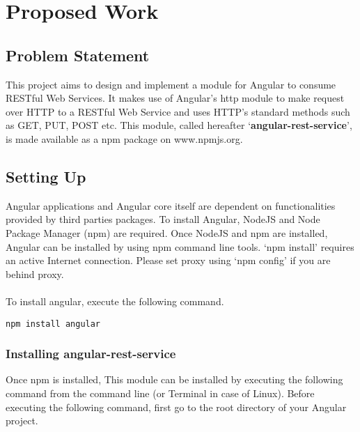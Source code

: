 \chapter{Proposed Work}
\pagestyle{fancy}
\fancyhead[LO]{\itshape\nouppercase{\rightmark}}



\section{Problem Statement}

\hspace{0.2in}This project aims to design and implement a module for Angular to consume RESTful Web Services.
It makes use of Angular's http module to make request over HTTP to a RESTful Web Service and uses HTTP's standard methods such as GET, PUT, POST etc. This module, called hereafter `\textbf{angular-rest-service}', is made available as a npm package on www.npmjs.org.


\section{Setting Up}

\hspace{0.2in}Angular applications and Angular core itself are dependent on functionalities provided by third parties packages. To install Angular, NodeJS and Node Package Manager (npm) are required. Once NodeJS and npm are installed, Angular can be installed by using npm command line tools. `npm install' requires an active Internet connection. Please set proxy using `npm config' if you are behind proxy.\\
\\
To install angular, execute the following command.
\begin{lstlisting}[language=command]
	 npm install angular
\end{lstlisting}
	  

\subsection{Installing angular-rest-service}

\hspace{0.2in}Once npm is installed, This module can be installed by executing the following command from the command line (or Terminal in case of Linux). Before executing the following command, first go to the root directory of your Angular project.
	
